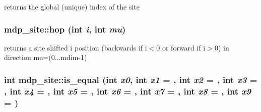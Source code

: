 returns the global (unique) index of the site \hypertarget{classmdp__site_a5982cae4c0bf2c255a978529dc6afe6c}{
\subsubsection[{hop}]{ mdp\_\-site::hop (int {\em i}, \/  int {\em mu})}}
\label{classmdp__site_a5982cae4c0bf2c255a978529dc6afe6c}
returns a site shifted i position (backwards if i$<$0 or forward if i$>$0) in direction mu=(0...mdim-\/1) \hypertarget{classmdp__site_a0bf9ef3d304245c68e00d7b66886f020}{
\subsubsection[{is\_\-equal}]{\setlength{\rightskip}{0pt plus 5cm}int mdp\_\-site::is\_\-equal (int {\em x0}, \/  int {\em x1} = {}, \/  int {\em x2} = {}, \/  int {\em x3} = {}, \/  int {\em x4} = {}, \/  int {\em x5} = {}, \/  int {\em x6} = {}, \/  int {\em x7} = {}, \/  int {\em x8} = {}, \/  int {\em x9} = {})}}
\label{classmdp__site_a0bf9ef3d304245c68e00d7b66886f020}


